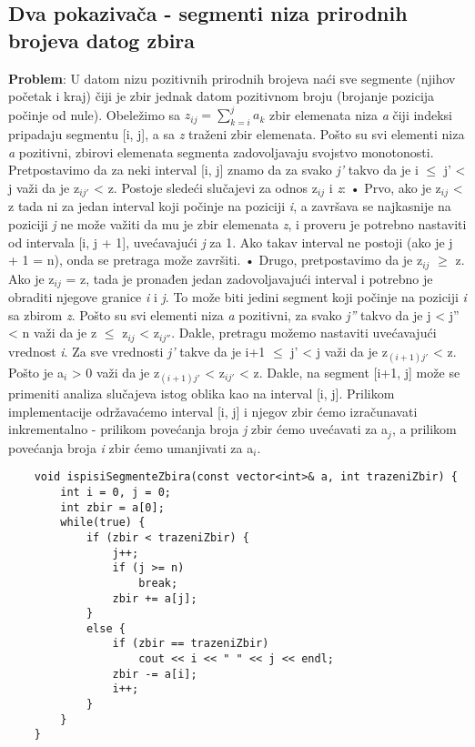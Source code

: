 \documentclass{article}
\begin{document}
\subsection{Dva pokazivača - segmenti niza prirodnih brojeva datog zbira}
\textbf{Problem}: U datom nizu pozitivnih prirodnih brojeva naći sve segmente (njihov
početak i kraj) čiji je zbir jednak datom pozitivnom broju (brojanje pozicija
počinje od nule).
\newline
Obeležimo sa $z_{ij} = \sum_{k=i}^j a_k$ zbir elemenata niza \textit{a} čiji indeksi pripadaju segmentu
[i, j], a sa \textit{z} traženi zbir elemenata. Pošto su svi elementi niza \textit{a} pozitivni, zbirovi
elemenata segmenta zadovoljavaju svojstvo monotonosti. Pretpostavimo da za neki interval [i, j] znamo da za svako \textit{j'} takvo da je 
i $\leq$ j' < j
važi da je z$_{ij'}$ < z. Postoje sledeći slučajevi za odnos z$_{ij}$ i \textit{z}:
\vspace{0.1cm}\newline
\hspace*{0.3cm}• Prvo, ako je z$_{ij}$ < z tada ni za jedan interval koji počinje na poziciji \textit{i}, a
završava se najkasnije na poziciji \textit{j} ne može važiti da mu je zbir elemenata
\textit{z}, i proveru je potrebno nastaviti od intervala [i, j + 1], uvećavajući \textit{j} za
1. Ako takav interval ne postoji (ako je j + 1 = n), onda se pretraga
može završiti.
\vspace{0.1cm}\newline
\hspace*{0.3cm}• Drugo, pretpostavimo da je z$_{ij}$ $\geq$ z. Ako je z$_{ij}$ = z, tada je pronađen
jedan zadovoljavajući interval i potrebno je obraditi njegove granice \textit{i} i \textit{j}.
To može biti jedini segment koji počinje na poziciji \textit{i} sa zbirom \textit{z}. Pošto su svi elementi niza
\textit{a} pozitivni, za svako \textit{j''} takvo da je j < j'' < n važi da je z $\leq$ z$_{ij}$ < z$_{ij''}$.
Dakle, pretragu možemo nastaviti uvećavajući vrednost \textit{i}. Za sve vrednosti
\textit{j'} takve da je i+1 $\leq$ j' < j važi da je z$_{(i+1)j'}$ < z. Pošto je a$_i$ > 0
važi da je z$_{(i+1)j'}$ < z$_{ij'}$ < z. Dakle, na segment [i+1, j] može se primeniti
analiza slučajeva istog oblika kao na interval [i, j].
\vspace{0.1cm}\newline
Prilikom implementacije održavaćemo interval [i, j] i njegov zbir ćemo izračunavati inkrementalno - prilikom povećanja broja \textit{j} zbir ćemo uvećavati za a$_j$, a
prilikom povećanja broja \textit{i} zbir ćemo umanjivati za a$_i$.
\begin{lstlisting}
    void ispisiSegmenteZbira(const vector<int>& a, int trazeniZbir) {
        int i = 0, j = 0;
        int zbir = a[0];
        while(true) {
            if (zbir < trazeniZbir) {
                j++;
                if (j >= n)
                    break;
                zbir += a[j];
            } 
            else {
                if (zbir == trazeniZbir)
                    cout << i << " " << j << endl;
                zbir -= a[i];
                i++;
            }
        }
    }
\end{lstlisting}
\end{document}
